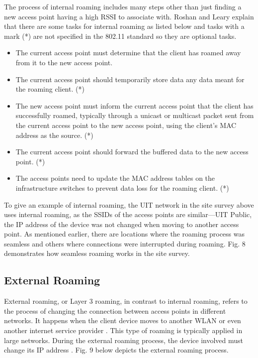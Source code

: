 \documentclass[conference]{IEEEtran}
\begin{document}
The process of internal roaming includes many steps other than just finding a new access point having a high RSSI to associate with. Roshan and Leary \cite{article_example} explain that there are some tasks for internal roaming as listed below and tasks with a mark (*) are not specified in the 802.11 standard so they are optional tasks.

\begin{itemize}
    \item The current access point must determine that the client has roamed away from it to the new access point.
    \item The current access point should temporarily store data any data meant for the roaming client. (*)
    \item The new access point must inform the current access point that the client has successfully roamed, typically through a unicast or multicast packet sent from the current access point to the new access point, using the client's MAC address as the source. (*)
    \item The current access point should forward the buffered data to the new access point. (*)
    \item The access points need to update the MAC address tables on the infrastructure switches to prevent data loss for the roaming client. (*)
\end{itemize}


To give an example of internal roaming, the UIT network in the site survey above uses internal roaming, as the SSIDs of the access points are similar—UIT Public, the IP address of the device was not changed when moving to another access point. As mentioned earlier, there are locations where the roaming process was seamless and others where connections were interrupted during roaming. Fig. 8 demonstrates how seamless roaming works in the site survey.



\subsection{External Roaming}

External roaming, or Layer 3 roaming, in contrast to internal roaming, refers to the process of changing the connection between access points in different networks. It happens when the client device moves to another WLAN or even another internet service provider \cite{article_example}. This type of roaming is typically applied in large networks. During the external roaming process, the device involved must change its IP address \cite{article_example}. Fig. 9 below depicts the external roaming process.
\end{document}
